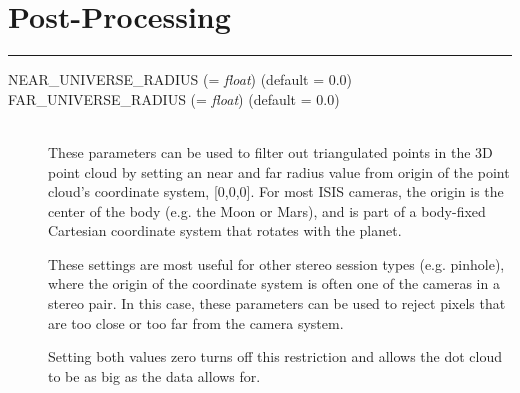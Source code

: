 
\section{Post-Processing}
\hrule
\bigskip

\begin{description}
\item[NEAR\_UNIVERSE\_RADIUS \textnormal{\small{(= \emph{float})}} (default = 0.0)]
\item[FAR\_UNIVERSE\_RADIUS \textnormal{\small{(= \emph{float})}} (default = 0.0)] \hfill \\
  These parameters can be used to filter out triangulated points in
  the 3D point cloud by setting an near and far radius value from
  origin of the point cloud's coordinate system, [0,0,0].  For most
  ISIS cameras, the origin is the center of the body (e.g. the Moon or
  Mars), and is part of a body-fixed Cartesian coordinate system that
  rotates with the planet.

  These settings are most useful for other stereo session types
  (e.g. pinhole), where the origin of the coordinate system is often
  one of the cameras in a stereo pair.  In this case, these parameters
  can be used to reject pixels that are too close or too far from the
  camera system.

  Setting both values zero turns off this restriction and allows the
  dot cloud to be as big as the data allows for.

\end{description}


